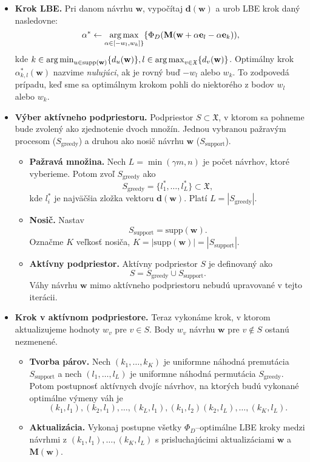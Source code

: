 \begin{itemize}
	\item \textbf{Krok LBE.} Pri danom návrhu $\mathbf w$, vypočítaj $\mathbf {d(w)}$ a urob LBE krok daný nasledovne: $$\alpha^* \leftarrow \operatorname*{arg\,max}_{\alpha \in [-w_l, w_k] \}} \{ \Phi_D(\mathbf M(\mathbf w+\alpha \mathbf e_l -\alpha \mathbf e_k)),$$ kde 
	$k \in \operatorname*{arg\,min}_{u \in \text{supp}(\mathbf w)} \{ d_u(\mathbf w)\}, l \in \operatorname*{arg\,max}_{v \in \mathfrak X} \{ d_v(\mathbf w)\}$. Optimálny krok $\alpha^*_{k,l}(\mathbf w)$ nazvime \textit{nulujúci}, ak je rovný buď $-w_l$ alebo $w_k$. To zodpovedá prípadu, keď sme sa optimálnym krokom pohli do niektorého z bodov $w_l$ alebo $w_k$.

	\item \textbf{Výber aktívneho podpriestoru.} Podpriestor $S \subset \mathfrak X$, v ktorom sa pohneme bude zvolený ako zjednotenie dvoch množín. Jednou vybranou pažravým procesom ($S_\text{greedy}$) a druhou ako nosič návrhu $\mathbf w$ ($S_\text{support}$).
	\begin{itemize}
		\item \textbf{Pažravá množina.} Nech $L=\min (\gamma m, n)$ je počet návrhov, ktoré vyberieme. Potom zvoľ $S_\text{greedy}$ ako $$S_\text{greedy} = \{l_1^*, \dots, l_L^* \} \subset \mathfrak X,$$ kde $l_i^*$ je najväčšia zložka vektoru $\mathbf d(\mathbf w)$. Platí $L=|S_\text{greedy}|$.
		\item \textbf{Nosič.} Nastav $$S_\text{support}=\text{supp}(\mathbf w).$$ Označme $K$ veľkosť nosiča, $K= |\text{supp}(\mathbf w)|=|S_\text{support}|$.
		\item \textbf{Aktívny podpriestor.} Aktívny podpriestor $S$ je definovaný ako $$S=S_\text{greedy} \cup S_\text{support}.$$ Váhy návrhu $\mathbf w$ mimo aktívneho podpriestoru nebudú upravované v tejto iterácii.
	\end{itemize}

	\item \textbf{Krok v aktívnom podpriestore.} Teraz vykonáme krok, v ktorom aktualizujeme hodnoty $w_v$ pre $v \in S$. Body $w_v$ návrhu $\mathbf w$ pre $v \not \in S$ ostanú nezmenené.
	\begin{itemize}
		\item \textbf{Tvorba párov.} Nech $(k_1, \dots, k_K)$ je uniformne náhodná premutácia $S_\text{support}$ a nech $(l_1, \dots, l_L)$ je uniformne náhodná permutácia $S_\text{greedy}$. Potom postupnosť aktívnych dvojíc návrhov, na ktorých budú vykonané optimálne výmeny váh je $$ (k_1,l_1), (k_2, l_1), \dots, (k_L, l_1), (k_1, l_2) (k_2,l_L), \dots, (k_K, l_L). $$
		\item \textbf{Aktualizácia.} Vykonaj postupne všetky $\Phi_D$--optimálne LBE kroky medzi návrhmi z $ (k_1,l_1), \dots, (k_K, l_L)$ s prisluchajúcimi aktualizáciami $\mathbf w$ a $\mathbf {M(w)}$.
	\end{itemize}
\end{itemize}

